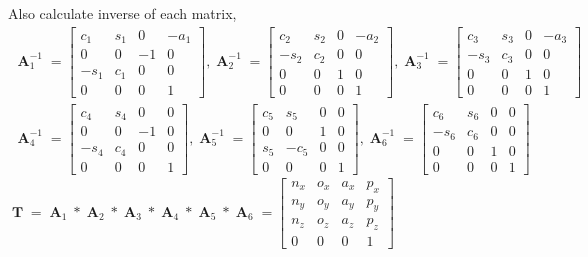 \documentclass[12pt]{article}
\DeclareMathOperator{\A}{\mathbf{A}}
\DeclareMathOperator{\T}{\mathbf{T}}
\begin{document}
  Also calculate inverse of each matrix,\\
  \begin{align*}
    \A_1^{-1} =
    \begin{bmatrix}
      c_1 & s_1 & 0 & -a_1\\
      0 & 0 & -1 & 0\\
      -s_1 & c_1 & 0 & 0\\
      0 & 0 & 0 & 1
    \end{bmatrix},
    \A_2^{-1} =
    \begin{bmatrix}
      c_2 & s_2 & 0 & -a_2\\
      -s_2 & c_2 & 0 & 0\\
      0 & 0 & 1 & 0\\
      0 & 0 & 0 & 1
    \end{bmatrix},
    \A_3^{-1} =
    \begin{bmatrix}
      c_3 & s_3 & 0 & -a_3\\
      -s_3 & c_3 & 0 & 0\\
      0 & 0 & 1 & 0\\
      0 & 0 & 0 & 1
    \end{bmatrix}
  \end{align*}
  \begin{align*}
    \A_4^{-1} =
    \begin{bmatrix}
      c_4 & s_4 & 0 & 0\\
      0 & 0 & -1 & 0\\
      -s_4 & c_4 & 0 & 0\\
      0 & 0 & 0 & 1
    \end{bmatrix},
    \A_5^{-1} =
    \begin{bmatrix}
      c_5 & s_5 & 0 & 0\\
      0 & 0 & 1 & 0\\
      s_5 & -c_5 & 0 & 0\\
      0 & 0 & 0 & 1
    \end{bmatrix},
    \A_6^{-1} =
    \begin{bmatrix}
      c_6 & s_6 & 0 & 0\\
      -s_6 & c_6 & 0 & 0\\
      0 & 0 & 1 & 0\\
      0 & 0 & 0 & 1
    \end{bmatrix}
  \end{align*}
  $\T = \A_1 * \A_2 * \A_3 * \A_4 * \A_5 * \A_6 = 
  \begin{bmatrix}
    n_x & o_x & a_x & p_x\\
    n_y & o_y & a_y & p_y\\
    n_z & o_z & a_z & p_z\\
    0 & 0 & 0 & 1
  \end{bmatrix}$
  
\end{document}
